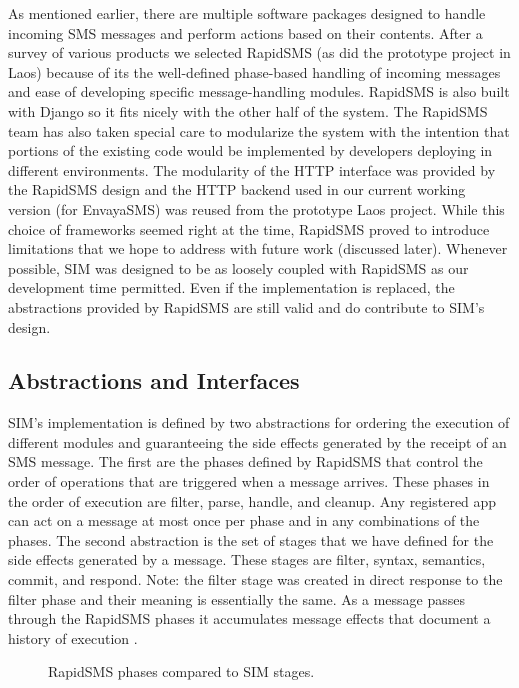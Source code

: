 \documentclass{acm_proc_article-sp}
\begin{document}
As mentioned earlier, there are multiple software packages designed to handle incoming SMS messages and perform actions based on their contents. After a survey of various products we selected RapidSMS (as did the prototype project in Laos) because of its the well-defined phase-based handling of incoming messages and ease of developing specific message-handling modules. RapidSMS is also built with Django so it fits nicely with the other half of the system. The RapidSMS team has also taken special care to modularize the system with the intention that portions of the existing code would be implemented by developers deploying in different environments. The modularity of the HTTP interface was provided by the RapidSMS design and the HTTP backend used in our current working version (for EnvayaSMS) was reused from the prototype Laos project. While this choice of frameworks seemed right at the time, RapidSMS proved to introduce limitations that we hope to address with future work (discussed later). Whenever possible, SIM was designed to be as loosely coupled with RapidSMS as our development time permitted. Even if the implementation is replaced, the abstractions provided by RapidSMS are still valid and do contribute to SIM’s design.

\subsection{Abstractions and Interfaces}

SIM’s implementation is defined by two abstractions for ordering the execution of different modules and guaranteeing the side effects generated by the receipt of an SMS message. The first are the phases defined by RapidSMS that control the order of operations that are triggered when a message arrives. These phases in the order of execution are filter, parse, handle, and cleanup. Any registered app can act on a message at most once per phase and in any combinations of the phases. The second abstraction is the set of stages that we have defined for the side effects generated by a message. These stages are filter, syntax, semantics, commit, and respond. Note: the filter stage was created in direct response to the filter phase and their meaning is essentially the same. As a message passes through the RapidSMS phases it accumulates message effects that document a history of execution \cite{rapidsms:routers}. 

\begin{figure*}
\centering
{}
\caption{RapidSMS phases compared to SIM stages.}
\end{figure*}
\end{document}
